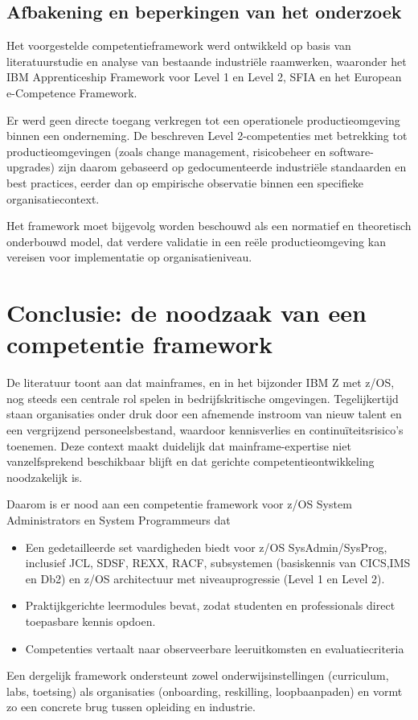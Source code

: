 \subsection{Afbakening en beperkingen van het onderzoek}

Het voorgestelde competentieframework werd ontwikkeld op basis van literatuurstudie en analyse van bestaande industriële raamwerken, waaronder het IBM Apprenticeship Framework voor Level 1 en Level 2, SFIA en het European e-Competence Framework. 

Er werd geen directe toegang verkregen tot een operationele productieomgeving binnen een onderneming. De beschreven Level 2-competenties met betrekking tot productieomgevingen (zoals change management, risicobeheer en software-upgrades) zijn daarom gebaseerd op gedocumenteerde industriële standaarden en best practices, eerder dan op empirische observatie binnen een specifieke organisatiecontext.

Het framework moet bijgevolg worden beschouwd als een normatief en theoretisch onderbouwd model, dat verdere validatie in een reële productieomgeving kan vereisen voor implementatie op organisatieniveau.

\section{Conclusie: de noodzaak van een competentie framework}
\label{sec:conclusie-literatuur-studie-framework}
De literatuur toont aan dat mainframes, en in het bijzonder IBM Z met z/OS, nog steeds een centrale rol spelen in bedrijfskritische omgevingen. Tegelijkertijd staan organisaties onder druk door een afnemende instroom van nieuw talent en een vergrijzend personeelsbestand, waardoor kennisverlies en continuïteitsrisico’s toenemen. Deze context maakt duidelijk dat mainframe-expertise niet vanzelfsprekend beschikbaar blijft en dat gerichte competentieontwikkeling noodzakelijk is.

Daarom is er nood aan een competentie framework voor z/OS System Administrators en System Programmeurs dat 
\begin{itemize}
	\item Een gedetailleerde set vaardigheden biedt voor z/OS SysAdmin/SysProg, inclusief JCL, SDSF, REXX, RACF, subsystemen (basiskennis van CICS,IMS en Db2) en z/OS architectuur met niveauprogressie (Level 1 en Level 2).
	\item Praktijkgerichte leermodules bevat, zodat studenten en professionals direct toepasbare kennis opdoen.
	\item Competenties vertaalt naar observeerbare leeruitkomsten en evaluatiecriteria
\end{itemize}
Een dergelijk framework ondersteunt zowel onderwijsinstellingen (curriculum, labs, toetsing) als organisaties (onboarding, reskilling, loopbaanpaden) en vormt zo een concrete brug tussen opleiding en industrie.

